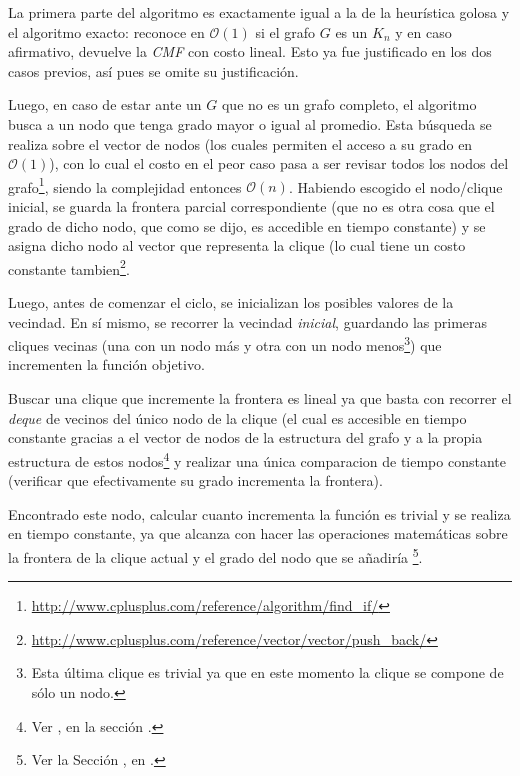 \bigskip

\par La primera parte del algoritmo es exactamente igual a la de la
    heur\'istica golosa y el algoritmo exacto: reconoce en $\mathcal O(1)$
    si el grafo $G$ es un $K_n$ y en caso afirmativo, devuelve
    la \emph{CMF} con costo lineal. Esto ya fue justificado en
    los dos casos previos, as\'i pues se omite su justificaci\'on.

\par Luego, en caso de estar ante un $G$ que no es un grafo completo,
    el algoritmo busca a un nodo que tenga grado mayor o igual al
    promedio. Esta b\'usqueda se realiza sobre el vector de nodos
    (los cuales permiten el acceso a su grado en $\mathcal O(1)$),
    con lo cual el costo en el peor caso pasa a ser revisar
    todos los nodos del grafo\footnote{\url{http://www.cplusplus.com/reference/algorithm/find_if/}},
    siendo la complejidad entonces $\mathcal O(n)$. Habiendo
    escogido el nodo/clique inicial, se guarda la frontera
    parcial correspondiente (que no es otra cosa que el grado
    de dicho nodo, que como se dijo, es accedible en tiempo
    constante) y se asigna dicho nodo al vector que representa
    la clique (lo cual tiene un costo constante tambien\footnote{%
    \url{http://www.cplusplus.com/reference/vector/vector/push_back/}}.

\par Luego, antes de comenzar el ciclo, se inicializan los posibles
    valores de la vecindad. En s\'i mismo, se recorrer la vecindad
    \emph{inicial}, guardando las primeras cliques vecinas (una
    con un nodo m\'as y otra con un nodo menos\footnote{Esta \'ultima
    clique es trivial ya que en este momento la clique se compone
    de s\'olo un nodo.}) que incrementen la funci\'on objetivo.

\par Buscar una clique que incremente la frontera es lineal ya
    que basta con recorrer el \emph{deque} de vecinos del
    \'unico nodo de la clique (el cual es accesible en tiempo
    constante gracias a el vector de nodos de la estructura del
    grafo y a la propia estructura de estos nodos\footnote{Ver
    \emph{}, en la secci\'on
    \emph{}.} y realizar una
    \'unica comparacion de tiempo constante (verificar que
    efectivamente su grado incrementa la frontera).

\par Encontrado este nodo, calcular cuanto incrementa la funci\'on
    es trivial y se realiza en tiempo constante, ya que alcanza
    con hacer las operaciones matem\'aticas sobre la frontera
    de la clique actual y el grado del nodo que se a\~nadir\'ia%
    \footnote{Ver la Secci\'on \emph{},
    en \emph{}.}.

